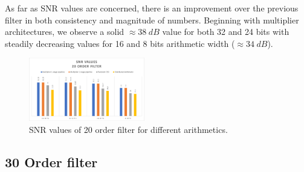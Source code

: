 As far as SNR values are concerned, there is an improvement over the previous filter in both consistency and magnitude of numbers. Beginning with multiplier architectures, we observe a solid $\approx 38 \hspace{3pt} dB$ value for both 32 and 24 bits with steadily decreasing values for 16 and 8 bits arithmetic width ($\approx 34 \hspace{3pt} dB$).

\begin{figure}
	\centering
	\includegraphics[width=0.45\textwidth]{../Images/FIR_20_Order/snr_values.png}
	\caption{SNR values of 20 order filter for different arithmetics.}
	\label{fig:fir_20_snr}
\end{figure}

\subsection{30 Order filter}


